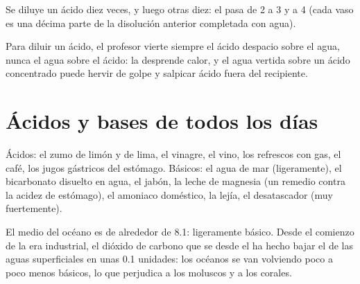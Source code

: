 \begin{omfigure}

{\small Se diluye un ácido diez veces, y luego otras diez: el  pasa de
2 a 3 y a 4 (cada vaso es una décima parte de la disolución anterior
completada con agua).}
\end{omfigure}

\begin{inthelab}
Para diluir un ácido, el profesor vierte siempre el ácido despacio sobre
el agua, nunca el agua sobre el ácido: la  desprende calor, y el
agua vertida sobre un ácido concentrado puede hervir de golpe y
salpicar ácido fuera del recipiente.
\end{inthelab}

\section{Ácidos y bases de todos los días}

\begin{proposition}\label{prop:g9:acids-bases-ph:everyday}
Ácidos: el zumo de limón y de lima, el vinagre, el vino, los refrescos
con gas, el café, los jugos gástricos del estómago. Básicos: el agua de
mar (ligeramente), el bicarbonato disuelto en agua, el jabón, la leche
de magnesia (un remedio contra la acidez de estómago), el amoniaco
doméstico, la lejía, el desatascador (muy fuertemente).
\end{proposition}

\begin{example}\label{ex:g9:acids-bases-ph:ocean}
El  medio del océano es de alrededor de 8.1: ligeramente básico. Desde
el comienzo de la era industrial, el dióxido de carbono que se 
desde el  ha hecho bajar el  de las aguas superficiales en unas
0.1 unidades: los océanos se van volviendo poco a poco menos básicos, lo
que perjudica a los moluscos y a los corales.
\end{example}

